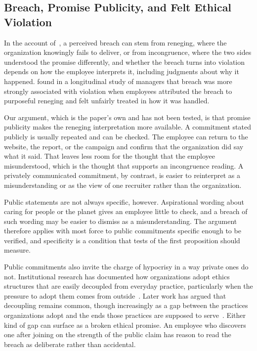 \documentclass[12pt,a4paper]{article}
\theoremstyle{definition}
\begin{document}
\subsection{Breach, Promise Publicity, and Felt Ethical Violation}

In the account of~\citet{morrison1997employees}, a perceived breach can stem from reneging, where the organization knowingly fails to deliver, or from incongruence, where the two sides understood the promise differently, and whether the breach turns into violation depends on how the employee interprets it, including judgments about why it happened. \citet{robinson2000development} found in a longitudinal study of managers that breach was more strongly associated with violation when employees attributed the breach to purposeful reneging and felt unfairly treated in how it was handled.

Our argument, which is the paper's own and has not been tested, is that promise publicity makes the reneging interpretation more available. A commitment stated publicly is usually repeated and can be checked. The employee can return to the website, the report, or the campaign and confirm that the organization did say what it said. That leaves less room for the thought that the employee misunderstood, which is the thought that supports an incongruence reading. A privately communicated commitment, by contrast, is easier to reinterpret as a misunderstanding or as the view of one recruiter rather than the organization.

Public statements are not always specific, however. Aspirational wording about caring for people or the planet gives an employee little to check, and a breach of such wording may be easier to dismiss as a misunderstanding. The argument therefore applies with most force to public commitments specific enough to be verified, and specificity is a condition that tests of the first proposition should measure.

Public commitments also invite the charge of hypocrisy in a way private ones do not. Institutional research has documented how organizations adopt ethics structures that are easily decoupled from everyday practice, particularly when the pressure to adopt them comes from outside~\citep{weaver1999integrated}. Later work has argued that decoupling remains common, though increasingly as a gap between the practices organizations adopt and the ends those practices are supposed to serve~\citep{bromley2012smoke}. Either kind of gap can surface as a broken ethical promise. An employee who discovers one after joining on the strength of the public claim has reason to read the breach as deliberate rather than accidental.
\end{document}

